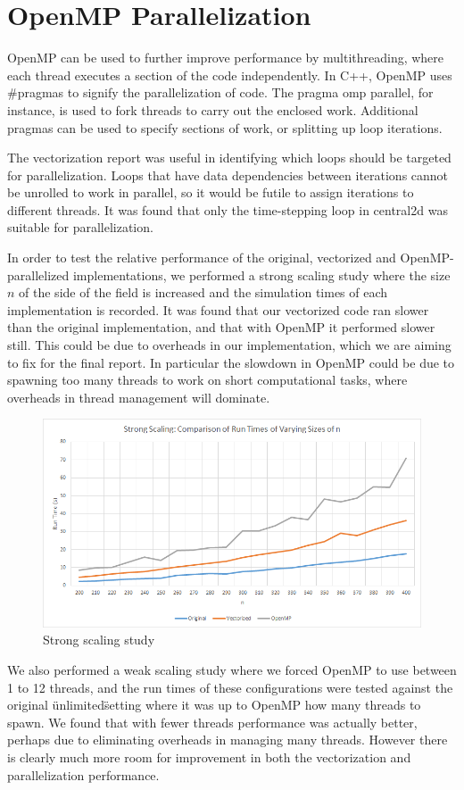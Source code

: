 \documentclass{article}
\begin{document}
\section*{OpenMP Parallelization}
OpenMP can be used to further improve performance by multithreading, where each thread executes a section of the code independently. In C++, OpenMP uses \#pragmas to signify the parallelization of code. The pragma omp parallel, for instance, is used to fork threads to carry out the enclosed work. Additional pragmas can be used to specify sections of work, or splitting up loop iterations. 

The vectorization report was useful in identifying which loops should be targeted for parallelization. Loops that have data dependencies between iterations cannot be unrolled to work in parallel, so it would be futile to assign iterations to different threads. It was found that only the time-stepping loop in central2d was suitable for parallelization.

In order to test the relative performance of the original, vectorized and OpenMP-parallelized implementations, we performed a strong scaling study where the size $n$ of the side of the field is increased and the simulation times of each implementation is recorded. It was found that our vectorized code ran slower than the original implementation, and that with OpenMP it performed slower still. This could be due to overheads in our implementation, which we are aiming to fix for the final report. In particular the slowdown in OpenMP could be due to spawning too many threads to work on short computational tasks, where overheads in thread management will dominate.

\begin{figure}[here]
  \centering
  \includegraphics[width=0.8\linewidth]{strong-scaling.png}
  \caption{Strong scaling study}
  \label{fig4}
\end{figure}

We also performed a weak scaling study where we forced OpenMP to use between 1 to 12 threads, and the run times of these configurations were tested against the original \"unlimited\" setting where it was up to OpenMP how many threads to spawn. We found that with fewer threads performance was actually better, perhaps due to eliminating overheads in managing many threads. However there is clearly much more room for improvement in both the vectorization and parallelization performance.
\end{document}
